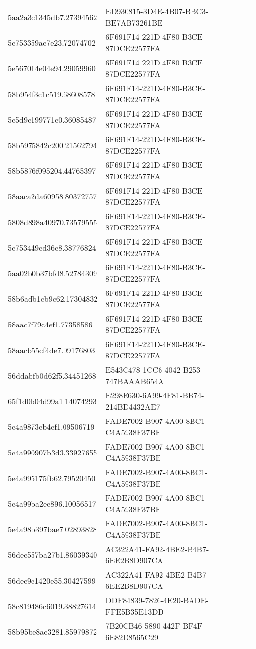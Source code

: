 \begin{tabular}{ll}
5aa2a3c1345db7.27394562 & ED930815-3D4E-4B07-BBC3-BE7AB73261BE \\
5c753359ac7e23.72074702 & 6F691F14-221D-4F80-B3CE-87DCE22577FA \\
5e567014e04e94.29059960 & 6F691F14-221D-4F80-B3CE-87DCE22577FA \\
58b954f3c1c519.68608578 & 6F691F14-221D-4F80-B3CE-87DCE22577FA \\
5c5d9c199771e0.36085487 & 6F691F14-221D-4F80-B3CE-87DCE22577FA \\
58b5975842c200.21562794 & 6F691F14-221D-4F80-B3CE-87DCE22577FA \\
58b5876f095204.44765397 & 6F691F14-221D-4F80-B3CE-87DCE22577FA \\
58aaca2da60958.80372757 & 6F691F14-221D-4F80-B3CE-87DCE22577FA \\
5808d898a40970.73579555 & 6F691F14-221D-4F80-B3CE-87DCE22577FA \\
5c753449ed36e8.38776824 & 6F691F14-221D-4F80-B3CE-87DCE22577FA \\
5aa02b0b37bfd8.52784309 & 6F691F14-221D-4F80-B3CE-87DCE22577FA \\
58b6adb1cb9c62.17304832 & 6F691F14-221D-4F80-B3CE-87DCE22577FA \\
58aac7f79c4ef1.77358586 & 6F691F14-221D-4F80-B3CE-87DCE22577FA \\
58aacb55cf4de7.09176803 & 6F691F14-221D-4F80-B3CE-87DCE22577FA \\
56ddabfb0d62f5.34451268 & E543C478-1CC6-4042-B253-747BAAAB654A \\
65f1d0b04d99a1.14074293 & E298E630-6A99-4F81-BB74-214BD4432AE7 \\
5e4a9873eb4ef1.09506719 & FADE7002-B907-4A00-8BC1-C4A5938F37BE \\
5e4a990907b3d3.33927655 & FADE7002-B907-4A00-8BC1-C4A5938F37BE \\
5e4a995175fb62.79520450 & FADE7002-B907-4A00-8BC1-C4A5938F37BE \\
5e4a99ba2ee896.10056517 & FADE7002-B907-4A00-8BC1-C4A5938F37BE \\
5e4a98b397bae7.02893828 & FADE7002-B907-4A00-8BC1-C4A5938F37BE \\
56dec557ba27b1.86039340 & AC322A41-FA92-4BE2-B4B7-6EE2B8D907CA \\
56dec9e1420e55.30427599 & AC322A41-FA92-4BE2-B4B7-6EE2B8D907CA \\
58c819486c6019.38827614 & DDF84839-7826-4E20-BADE-FFE5B35E13DD \\
58b95be8ac3281.85979872 & 7B20CB46-5890-442F-BF4F-6E82D8565C29 \\

\end{tabular}
